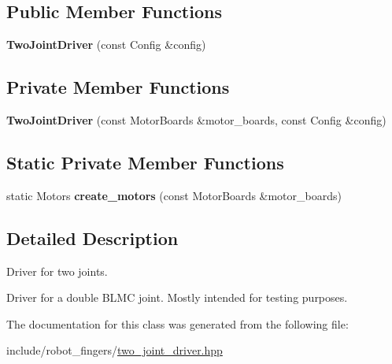 \subsection*{Public Member Functions}
\begin{DoxyCompactItemize}
\item 
\mbox{\label{classrobot__fingers_1_1TwoJointDriver_aef0955f6f1cc9f9353fb84db201aeca3}} 
{\bfseries Two\+Joint\+Driver} (const Config \&config)
\end{DoxyCompactItemize}
\subsection*{Private Member Functions}
\begin{DoxyCompactItemize}
\item 
\mbox{\label{classrobot__fingers_1_1TwoJointDriver_a448586ec7eef35fd05352c00c87b89ff}} 
{\bfseries Two\+Joint\+Driver} (const Motor\+Boards \&motor\+\_\+boards, const Config \&config)
\end{DoxyCompactItemize}
\subsection*{Static Private Member Functions}
\begin{DoxyCompactItemize}
\item 
\mbox{\label{classrobot__fingers_1_1TwoJointDriver_a3694dbc37d12ff1538aec8f3fe3e5bee}} 
static Motors {\bfseries create\+\_\+motors} (const Motor\+Boards \&motor\+\_\+boards)
\end{DoxyCompactItemize}


\subsection{Detailed Description}
Driver for two joints. 

Driver for a double B\+L\+MC joint. Mostly intended for testing purposes. 

The documentation for this class was generated from the following file\+:\begin{DoxyCompactItemize}
\item 
include/robot\+\_\+fingers/\hyperlink{two__joint__driver_8hpp}{two\+\_\+joint\+\_\+driver.\+hpp}\end{DoxyCompactItemize}
